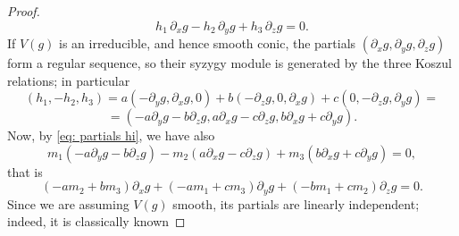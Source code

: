 \documentclass[a4paper, 11pt, reqno]{amsart}
\theoremstyle{plain}
\theoremstyle{definition}
\newcommand{\de}{\partial}
\begin{document}
\begin{proof}
\[
 h_1 \, \de_x g - h_2\, \de_y g +h_3 \, \de_z g=0.
\]
If $V(g)$ is an irreducible, and hence smooth conic, the partials 
$(\de_x g, \de_y g,\de_z g)$ form a regular sequence, so their syzygy module is generated by the three Koszul relations; in particular
\[
(h_1,-h_2,h_3)=a(-\de_y g, \de_x g,0) + b (-\de_z g, 0, \de_x g) + c(0,-\de_z g, \de_y g)
=
\]
\[
=(-a\de_y g -b\de_z g, a\de_x g -c\de_z g, b\de_x g+c\de_y g).
\]
Now, by \eqref{eq: partials hi}, we have also
\[
m_1 (-a\de_y g -b\de_z g)-m_2(a\de_x g -c\de_z g)+m_3(b\de_x g+c\de_y g)=0,
\]
that is
\[
(-am_2+bm_3)\de_x g +(-am_1+cm_3)\de_y g +(-bm_1+cm_2)\de_zg=0.
\]
Since we are assuming $V(g)$ smooth, its partials are linearly independent; indeed, it is classically known
\end{proof}



\end{document}
